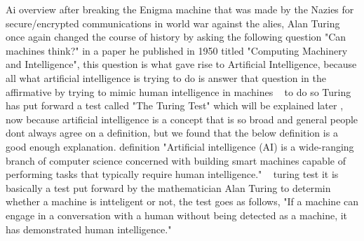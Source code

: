 Ai
    overview 
        after breaking the Enigma machine that was made by the Nazies for secure/encrypted communications in world war against the alies, Alan Turing once again changed the course of history by asking the following question "Can machines think?" in a paper he published in 1950 titled "Computing Machinery and Intelligence", this question is what gave rise to Artificial Intelligence, because all what artificial intelligence is trying to do is answer that question in the affirmative by trying to mimic human intelligence in machines ~\cite{ai} to do so Turing has put forward a test called "The Turing Test" which will be explained later , now because artificial intelligence is a concept that is  so broad and general people dont always agree on a definition, but we found that the below definition is a good enough explanation.
    definition
        "Artificial intelligence (AI) is a wide-ranging branch of computer science concerned with building smart machines capable of performing tasks that typically require human intelligence." ~\cite{ai}
    turing test
        it is basically a test put forward by the mathematician Alan Turing to determin whether a machine is intteligent or not, the test goes as follows, "If a machine can engage in a conversation with a human without being detected as a machine, it has demonstrated human intelligence." ~\cite{turing}
    
